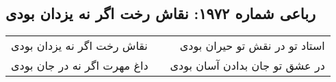\begin{center}
\section*{رباعی شماره ۱۹۷۲: نقاش رخت اگر نه یزدان بودی}
\label{sec:1972}
\begin{longtable}{l p{0.5cm} r}
نقاش رخت اگر نه یزدان بودی
&&
استاد تو در نقش تو حیران بودی
\\
داغ مهرت اگر نه در جان بودی
&&
در عشق تو جان بدادن آسان بودی
\\
\end{longtable}
\end{center}
